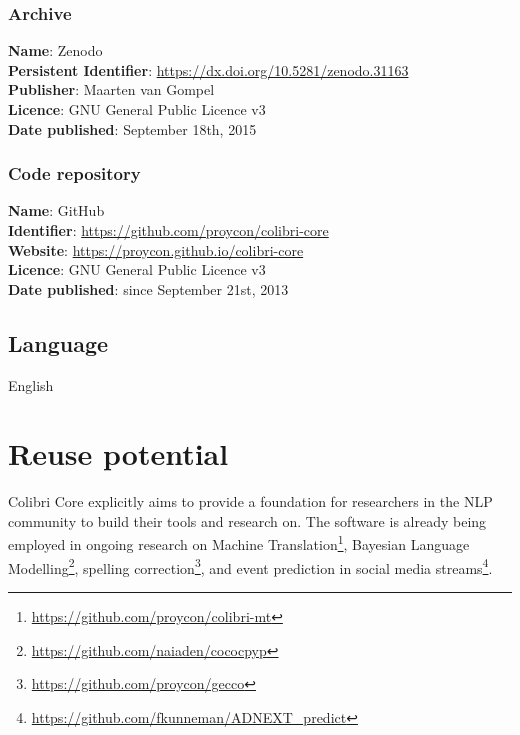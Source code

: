 \documentclass[a4paper,12pt]{article}
\begin{document}
\subsubsection{Archive}

\begin{addmargin}[2em]{2em}
\textbf{Name}: Zenodo \\
\textbf{Persistent Identifier}: \url{https://dx.doi.org/10.5281/zenodo.31163} \\
\textbf{Publisher}: Maarten van Gompel \\
\textbf{Licence}: GNU General Public Licence v3 \\
\textbf{Date published}: September 18th, 2015 \\
\end{addmargin}

\subsubsection{Code repository}

\begin{addmargin}[2em]{2em}
\textbf{Name}: GitHub \\
\textbf{Identifier}: \url{https://github.com/proycon/colibri-core} \\
\textbf{Website}: \url{https://proycon.github.io/colibri-core} \\
\textbf{Licence}: GNU General Public Licence v3 \\
\textbf{Date published}: since September 21st, 2013 \\
\end{addmargin}

\subsection{Language}

English


\section{Reuse potential}

Colibri Core explicitly aims to provide a foundation for researchers in the NLP
community to build their tools and research on. The software is already being
employed in ongoing research on Machine
Translation\footnote{\url{https://github.com/proycon/colibri-mt}}, Bayesian Language
Modelling\footnote{\url{https://github.com/naiaden/cococpyp}}, spelling
correction\footnote{\url{https://github.com/proycon/gecco}}, and event
prediction in social media streams\footnote{\url{https://github.com/fkunneman/ADNEXT\_predict}}.
\end{document}
